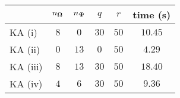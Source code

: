 \centering
\renewcommand{\arraystretch}{1.2}
\begin{tabular}{@{}lccccc@{}}
\toprule
 & $n_{\boldsymbol{\Omega}}$ & $n_{\boldsymbol{\Psi}}$ & $q$ & $r$ & time (s)\\
\midrule
KA (i) & $8$ & $0$ & $30$ & $50$ & $10.45$ \\
KA (ii) & $0$ & $13$ & $0$ & $50$ & $4.29$ \\
KA (iii) & $8$ & $13$ & $30$ & $50$ & $18.40$ \\
KA (iv) & $4$ & $6$ & $30$ & $50$ & $9.36$ \\
\bottomrule
\end{tabular}
